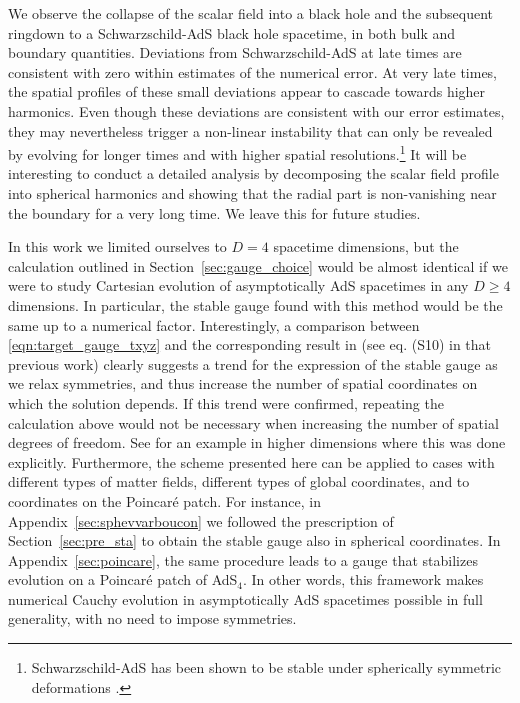 \documentclass[aps,letterpaper,twocolumn,nofootinbib]{revtex4}
\numberwithin{equation}{section}
\begin{document}
We observe the collapse of the scalar field into a black hole and the subsequent ringdown to a Schwarzschild-AdS black hole spacetime, in both bulk and boundary quantities.
Deviations from Schwarzschild-AdS at late times are consistent with zero within estimates of the numerical error. 
At very late times, the spatial profiles of these small deviations appear to cascade towards higher harmonics.
Even though these deviations are consistent with our error estimates, they may nevertheless trigger a non-linear instability that can only be revealed by evolving for longer times and with higher spatial resolutions.\footnote{Schwarzschild-AdS has been shown to be stable under spherically symmetric deformations \cite{Holzegel:2011uu}.} 
It will be interesting to conduct a detailed analysis by decomposing the scalar field profile into spherical harmonics and showing that the radial part is non-vanishing near the boundary for a very long time.
We leave this for future studies.

In this work we limited ourselves to $D=4$ spacetime dimensions, but the calculation outlined in Section~\ref{sec:gauge_choice} would be almost identical if we were to study Cartesian evolution of asymptotically AdS spacetimes in any $D\geq4$ dimensions. In particular, the stable gauge found with this method would be the same up to a numerical factor. 
Interestingly, a comparison between \eqref{eqn:target_gauge_txyz} and the corresponding result in \cite{Bantilan:2017kok} (see eq. (S10) in that previous work) clearly suggests a trend for the expression of the stable gauge as we relax symmetries, and thus increase the number of spatial coordinates on which the solution depends.
If this trend were confirmed, repeating the calculation above would not be necessary when increasing the number of spatial degrees of freedom.
See \cite{Bantilan:2020pay} for an example in higher dimensions where this was done explicitly.
Furthermore, the scheme presented here can be applied to cases with different types of matter fields, different types of global coordinates, and to coordinates on the Poincar\'{e} patch.
For instance, in Appendix~\ref{sec:sphevvarboucon} we followed the prescription of Section~\ref{sec:pre_sta} to obtain the stable gauge also in spherical coordinates.
In Appendix~\ref{sec:poincare}, the same procedure leads to a gauge that stabilizes evolution on a Poincar\'e patch of AdS$_4$.
In other words, this framework makes numerical Cauchy evolution in asymptotically AdS spacetimes possible in full generality, with no need to impose symmetries.
\end{document}
